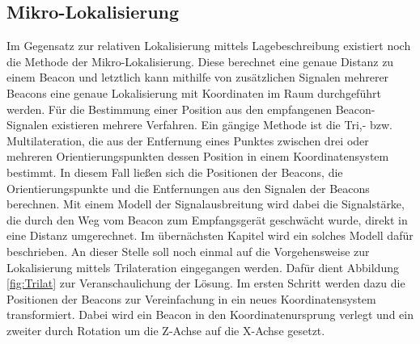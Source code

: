 \subsection{Mikro-Lokalisierung}
Im Gegensatz zur relativen Lokalisierung mittels Lagebeschreibung existiert noch die Methode der Mikro-Lokalisierung. Diese berechnet eine genaue Distanz zu einem Beacon und letztlich kann mithilfe von zusätzlichen Signalen mehrerer Beacons eine genaue Lokalisierung mit Koordinaten im Raum durchgeführt werden. Für die Bestimmung einer Position aus den empfangenen Beacon-Signalen existieren mehrere Verfahren. Ein gängige Methode ist die Tri,- bzw. Multilateration, die aus der Entfernung eines Punktes zwischen drei oder mehreren Orientierungspunkten dessen Position in einem Koordinatensystem bestimmt. In diesem Fall ließen sich die Positionen der Beacons, die Orientierungspunkte und die Entfernungen aus den Signalen der Beacons berechnen. Mit einem Modell der Signalausbreitung wird dabei die Signalstärke, die durch den Weg vom Beacon zum Empfangsgerät geschwächt wurde, direkt in eine Distanz umgerechnet. Im übernächsten Kapitel wird ein solches Modell dafür beschrieben. An dieser Stelle soll noch einmal auf die Vorgehensweise zur Lokalisierung mittels Trilateration eingegangen werden. Dafür dient Abbildung \ref{fig:Trilat} zur Veranschaulichung der Lösung. Im ersten Schritt werden dazu die Positionen der Beacons zur Vereinfachung in ein neues Koordinatensystem transformiert. Dabei wird ein Beacon in den Koordinatenursprung verlegt und ein zweiter durch Rotation um die Z-Achse auf die X-Achse gesetzt.
